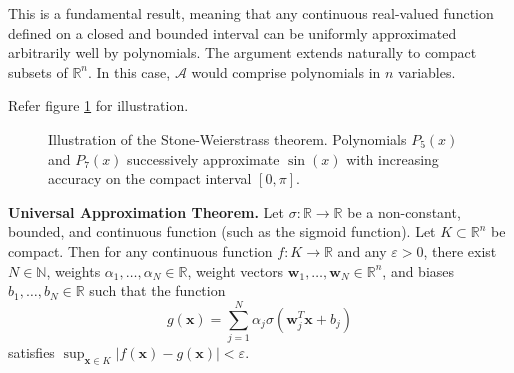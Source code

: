 This is a fundamental result, meaning that any continuous real-valued function defined on a closed and bounded interval can be uniformly approximated arbitrarily well by polynomials. The argument extends naturally to compact subsets of $\mathbb{R}^n$. In this case, $\mathcal{A}$ would comprise polynomials in $n$ variables.


Refer figure \ref{fig:stone-weierstrass} for illustration.

\begin{figure}[h]
\centering
{}
\caption{Illustration of the Stone-Weierstrass theorem. Polynomials $P_5(x)$ and $P_7(x)$ successively approximate $\sin(x)$ with increasing accuracy on the compact interval $[0, \pi]$.}
\label{fig:stone-weierstrass}
\end{figure}

\begin{theorem}
    \textbf{Universal Approximation Theorem.} Let $\sigma: \mathbb{R} \to \mathbb{R}$ be a non-constant, bounded, and continuous function (such as the sigmoid function). Let $K \subset \mathbb{R}^n$ be compact. Then for any continuous function $f: K \to \mathbb{R}$ and any $\varepsilon > 0$, there exist $N \in \mathbb{N}$, weights $\alpha_1, \ldots, \alpha_N \in \mathbb{R}$, weight vectors $\mathbf{w}_1, \ldots, \mathbf{w}_N \in \mathbb{R}^n$, and biases $b_1, \ldots, b_N \in \mathbb{R}$ such that the function
\[
g(\mathbf{x}) = \sum_{j=1}^{N} \alpha_j \sigma(\mathbf{w}_j^T \mathbf{x} + b_j)
\]
satisfies $\sup_{\mathbf{x} \in K} |f(\mathbf{x}) - g(\mathbf{x})| < \varepsilon$.
\end{theorem}

